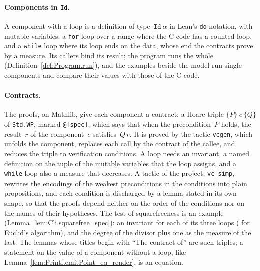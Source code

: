 \paragraph{Components in \texttt{Id}.} A component with a loop is a definition of
type~$\mathtt{Id}\ \alpha$ in Lean's \texttt{do} notation, with mutable variables: a \texttt{for}
loop over a range where the C code has a counted loop, and a \texttt{while} loop where its loop
ends on the data, whose end the contracts prove by a measure. Its callers bind its result; the
program runs the whole (Definition~\ref{def:Program.run}), and the examples beside the model run
single components and compare their values with those of the C code.

\paragraph{Contracts.} The proofs, on Mathlib, give each component a contract: a Hoare triple
$\{P\}\ c\ \{Q\}$ of \texttt{Std.WP}, marked \texttt{@[spec]}, which says that when the
precondition~$P$ holds, the result~$r$ of the component~$c$ satisfies~$Q\,r$. It is proved by the
tactic \texttt{vcgen}, which unfolds the component, replaces each call by the contract of the
callee, and reduces the triple to verification conditions. A loop needs an invariant, a named
definition on the tuple of the mutable variables that the loop assigns, and a \texttt{while} loop
also a measure that decreases. A tactic of the project, \texttt{vc\_simp}, rewrites the encodings
of the weakest preconditions in the conditions into plain propositions, and each condition is
discharged by a lemma stated in its own shape, so that the proofs depend neither on the order of
the conditions nor on the names of their hypotheses. The test of squarefreeness is an example
(Lemma~\ref{lem:Cli.squarefree_spec}): an invariant for each of its three loops
( for Euclid's algorithm), and the degree of the divisor plus
one as the measure of the last. The lemmas whose titles begin with ``The contract of'' are such
triples; a statement on the value of a component without a loop, like
Lemma~\ref{lem:Printf.emitPoint_eq_render}, is an equation.

